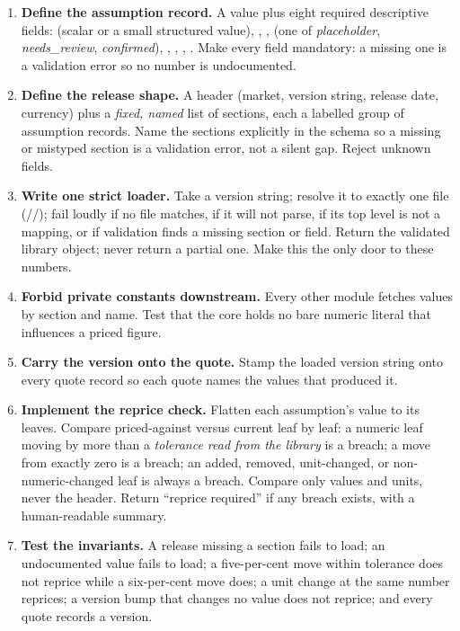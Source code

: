 \begin{rebuild}
\begin{enumerate}
  \item \textbf{Define the assumption record.} A value plus eight required descriptive fields:  (scalar or a small structured value), , ,  (one of \emph{placeholder}, \emph{needs\_review}, \emph{confirmed}), , , , . Make every field mandatory: a missing one is a validation error so no number is undocumented.
  \item \textbf{Define the release shape.} A header (market, version string, release date, currency) plus a \emph{fixed, named} list of sections, each a labelled group of assumption records. Name the sections explicitly in the schema so a missing or mistyped section is a validation error, not a silent gap. Reject unknown fields.
  \item \textbf{Write one strict loader.} Take a version string; resolve it to exactly one file (//); fail loudly if no file matches, if it will not parse, if its top level is not a mapping, or if validation finds a missing section or field. Return the validated library object; never return a partial one. Make this the only door to these numbers.
  \item \textbf{Forbid private constants downstream.} Every other module fetches values by section and name. Test that the core holds no bare numeric literal that influences a priced figure.
  \item \textbf{Carry the version onto the quote.} Stamp the loaded version string onto every quote record so each quote names the values that produced it.
  \item \textbf{Implement the reprice check.} Flatten each assumption's value to its leaves. Compare priced-against versus current leaf by leaf: a numeric leaf moving by more than a \emph{tolerance read from the library} is a breach; a move from exactly zero is a breach; an added, removed, unit-changed, or non-numeric-changed leaf is always a breach. Compare only values and units, never the header. Return ``reprice required'' if any breach exists, with a human-readable summary.
  \item \textbf{Test the invariants.} A release missing a section fails to load; an undocumented value fails to load; a five-per-cent move within tolerance does not reprice while a six-per-cent move does; a unit change at the same number reprices; a version bump that changes no value does not reprice; and every quote records a version.
\end{enumerate}
\end{rebuild}
